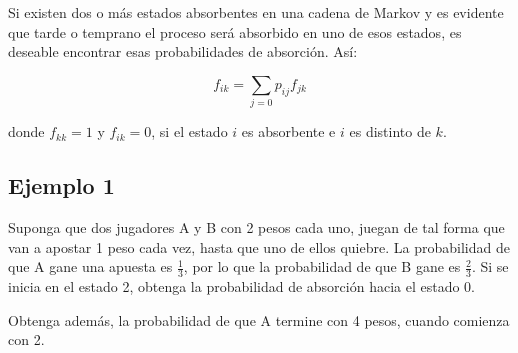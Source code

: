 \documentclass{article}
\begin{document}
Si existen dos o más estados absorbentes en una cadena de Markov y es evidente que tarde o temprano el proceso será absorbido en uno de esos estados, es deseable encontrar esas probabilidades de absorción. Así:

\[
    f_{ik} = \sum_{j=0} p_{ij}f_{jk}
\]

donde \( f_{kk} = 1 \) y \( f_{ik} = 0 \), si el estado \( i \) es absorbente e \( i \) es distinto de \( k \).

\subsection*{Ejemplo 1}

Suponga que dos jugadores A y B con 2 pesos cada uno, juegan de tal forma que van a apostar 1 peso cada vez, hasta que uno de ellos quiebre. La probabilidad de que A gane una apuesta es \( \frac{1}{3} \), por lo que la probabilidad de que B gane es \( \frac{2}{3} \). Si se inicia en el estado 2, obtenga la probabilidad de absorción hacia el estado 0.

Obtenga además, la probabilidad de que A termine con 4 pesos, cuando comienza con 2.
\end{document}

